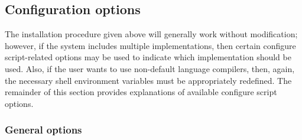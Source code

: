 
\subsection{Configuration options}\label{ss:configuration_options}

The installation procedure given above will generally work without modification;
however, if the system includes multiple {\mpi} implementations, then certain
configure script-related options may be used to indicate which {\mpi}
implementation should be used. Also, if the user wants to use non-default
language compilers, then, again, the necessary shell environment variables must
be appropriately redefined.
The remainder of this section provides explanations of available configure script
options.


\subsubsection*{General options}


